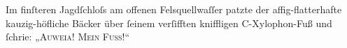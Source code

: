Im finſteren Jagdſchloſs am offenen Felsquellwaſſer patzte der affig-flatterhafte kauzig-höf\/liche Bäcker über ſeinem verſifften kniffligen C-Xylophon-Fuß und ſchrie: „\textsc{Auweia! Mein Fuß!}“